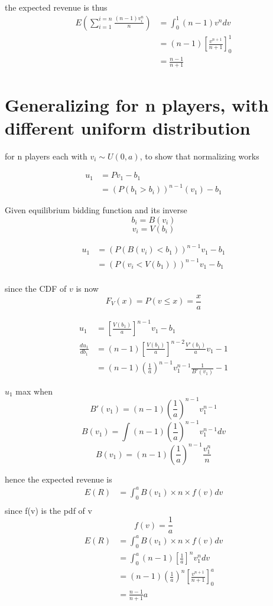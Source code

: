 \documentclass[10pt, a4paper]{article}
\begin{document}
the expected revenue is thus 
\begin{align*}
   E\left(\sum_{i = 1}^{i = n} \frac{(n-1)v_i^n}{n} \right) &= \int_0^1 (n-1)v^ndv \\
                                                            &= (n-1)\left[\frac{v^{n+1}}{n+1}\right]_0^1 \\
                                                            &= \frac{n-1}{n+1}
\end{align*}

\section{Generalizing for n players, with different uniform distribution}
for n players each with $v_i \sim U(0, a)$, to show that normalizing works

\begin{align*}
   u_1 &= Pv_1 - b_1 \\
       &= \left(P(b_1 > b_i)\right)^{n-1}(v_1) - b_1
\end{align*}	

Given equilibrium bidding function and its inverse
\[
   b_i = B(v_i)
\]
\[
   v_i = V(b_i)
\]

\begin{align*}
   u_1 &= \left(P(B(v_i) < b_1)\right)^{n-1}v_1 - b_1 \\
       &= \left(P(v_i < V(b_1))\right)^{n-1}v_1 - b_1 \\
\end{align*}	

since the CDF of $v$ is now
\[
   F_V(x) = P(v \le x) = \frac{x}{a}
\]

\begin{align*}
   u_1 &= \left[ \frac{V(b_1)}{a}\right]^{n-1}v_1 - b_1 \\
   \frac{du_1}{db_1} &= (n-1) \left[ \frac{V(b_1)}{a}\right]^{n-2} \frac{V'(b_1)}{a}v_1 - 1 \\
                     &= (n-1) \left(\frac{1}{a}\right)^{n-1}v_1^{n-1} \frac{1}{B'(v_1)} - 1
\end{align*}	

$u_1$ max when 
\[
   B'(v_1) = (n-1)\left(\frac{1}{a}\right)^{n-1}v_1^{n-1} 
\]
\[
   B(v_1) = \int(n-1)\left(\frac{1}{a}\right)^{n-1}v_1^{n-1} dv
\]
\[
   B(v_1) = (n-1)\left(\frac{1}{a}\right)^{n-1}\frac{v_1^n}{n}
\]

hence the expected revenue is
\begin{align*}
   E(R) &= \int_0^a B(v_1) \times n \times f(v) dv \\
\end{align*}	
since f(v) is the pdf of v 
\[
   f(v) = \frac{1}{a}
\]
\begin{align*}
   E(R) &= \int_0^a B(v_1) \times n \times f(v) dv \\
        &= \int_0^a(n-1)\left[\frac{1}{a}\right]^{n}v_1^n dv \\
        &= (n-1)\left(\frac{1}{a}\right)^{n} \left[\frac{v^{n+1}}{n+1}\right]_0^a \\
        &= \frac{n-1}{n+1} a 
\end{align*}	
\end{document}

